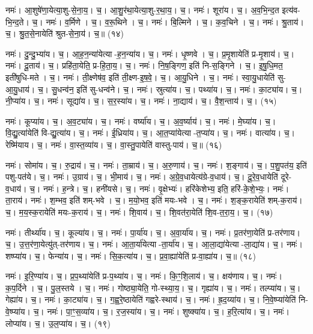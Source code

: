 नमः॑। आ॒शुषे॑णा॒येत्या॒शु-से॒ना॒य॒। च॒। आ॒शु॒र॑था॒येत्या॒शु-र॒था॒य॒। च॒। 
नमः॑। शूरा॑य। च॒। अ॒व॒भि॒न्द॒त इत्य॑व-भि॒न्द॒ते। च॒। 
नमः॑। व॒र्मिणे। च॒। व॒रू॒थिने। च॒। 
नमः॑। बि॒ल्मिने। च॒। क॒व॒चिने। च॒। 
नमः॑। श्रु॒ताय॑। च॒। श्रु॒त॒से॒नायेति॑ श्रुत-से॒ना॒य॑। च॒॥ (१४)


नमः॑। दु॒न्दु॒भ्या॑य। च॒। आ॒ह॒न॒न्या॑येत्या-ह॒न॒न्या॑य। च॒। 
नमः॑। धृ॒ष्णवे। च॒। प्र॒मृ॒शायेति॑ प्र-मृ॒शाय॑। च॒। 
नमः॑। दू॒ताय॑। च॒। प्रहि॑ता॒येति॒ प्र-हि॒ता॒य॒। च॒। 
नमः॑। नि॒ष॒ङ्गिण॒ इति॑ नि-स॒ङ्गिने। च॒। इ॒षु॒धि॒मत॒ इती॑षुधि-मते। च॒। 
नमः॑। ती॒क्ष्णेष॑व॒ इति॑ ती॒क्ष्ण-इ॒ष॒वे॒। च॒। आ॒यु॒धिने। च॒। 
नमः॑। स्वा॒यु॒धायेति॑ सु-आ॒यु॒धाय॑। च॒। सु॒धन्व॑न॒ इति॑ सु-धन्व॑ने। च॒। 
नमः॑। स्रुत्या॑य। च॒। पथ्या॑य। च॒। 
नमः॑। का॒ट्या॑य। च॒। नी॒प्या॑य। च॒। 
नमः॑। सूद्या॑य। च॒। स॒र॒स्या॑य। च॒। 
नमः॑। ना॒द्याय॑। च॒। वै॒श॒न्ताय॑। च॒। (१५)


नमः॑। कूप्या॑य। च॒। अ॒व॒ट्या॑य। च॒। 
नमः॑। वर्ष्या॑य। च॒। अ॒व॒र्ष्याय॑। च॒। 
नमः॑। मे॒घ्या॑य। च॒। वि॒द्यु॒त्या॑येति॑ वि-द्यु॒त्या॑य। च॒। 
नमः॑। ई॒ध्रिया॑य। च॒। आ॒त॒प्या॑येत्या-त॒प्या॑य। च॒। 
नमः॑। वात्या॑य। च॒। रेष्मि॑याय। च॒। 
नमः॑। वा॒स्त॒व्या॑य। च॒। वा॒स्तु॒पायेति॑ वास्तु-पाय॑। च॒॥ (१६)


नमः॑। सोमा॑य। च॒। रु॒द्राय॑। च॒। 
नमः॑। ता॒म्राय॑। च॒। अ॒रु॒णाय॑। च॒। 
नमः॑। श॒ङ्गाय॑। च॒। प॒शु॒पत॑य॒ इति॑ पशु-पत॑ये। च॒। 
नमः॑। उ॒ग्राय॑। च॒। भी॒माय॑। च॒। 
नमः॑। अ॒ग्रे॒व॒धायेत्य॑ग्रे-व॒धाय॑। च॒। दू॒रे॒व॒धायेति॑ दूरे-व॒धाय॑। च॒। 
नमः॑। ह॒न्त्रे। च॒। हनी॑यसे। च॒। 
नमः॑। वृ॒क्षेभ्यः॑। हरि॑केशेभ्य॒ इति॒ हरि॑-के॒शे॒भ्यः॒। 
नमः॑। ता॒राय॑। नमः॑। श॒म्भव॒ इति॑ शम्-भवे। च॒। म॒यो॒भव॒ इति॑ मयः-भवे। च॒। 
नमः॑। श॒ङ्क॒रायेति॑ शम्-क॒राय॑। च॒। म॒य॒स्क॒रायेति॑ मयः-क॒राय॑। च॒। 
नमः॑। शि॒वाय॑। च॒। शि॒वत॑रा॒येति॑ शि॒व-त॒रा॒य॒। च॒। (१७)


नमः॑। तीर्थ्या॑य। च॒। कूल्या॑य। च॒। 
नमः॑। पा॒र्या॑य। च॒। अ॒वा॒र्या॑य। च॒। 
नमः॑। प्र॒तर॑णा॒येति॑ प्र-तर॑णाय। च॒। उ॒त्त॒र॑णा॒येत्यु॑त्-तर॑णाय। च॒। 
नमः॑। आ॒ता॒र्या॑येत्या-ता॒र्या॑य। च॒। आ॒ला॒द्या॑येत्या-ला॒द्या॑य। च॒। 
नमः॑। शष्प्या॑य। च॒। फेन्या॑य। च॒। 
नमः॑। सि॒क॒त्या॑य। च॒। प्र॒वा॒ह्या॑येति॑ प्र-वा॒ह्या॑य। च॒॥ (१८)


नमः॑। इ॒रि॒ण्या॑य। च॒। प्र॒प॒थ्या॑येति॑ प्र-प॒थ्या॑य। च॒। 
नमः॑। कि॒ꣳ॒शि॒लाय॑। च॒। क्षय॑णाय। च॒। 
नमः॑। क॒प॒र्दिने। च॒। पु॒ल॒स्तये। च॒। 
नमः॑। गोष्ठ्या॒येति॒ गो-स्थ्या॒य॒। च॒। गृह्या॑य। च॒। 
नमः॑। तल्प्या॑य। च॒। गेह्या॑य। च॒। 
नमः॑। का॒ट्या॑य। च॒। ग॒ह्व॒रे॒ष्ठायेति॑ गह्वरे-स्थाय॑। च॒। 
नमः॑। ह्र॒द॒य्या॑य। च॒। नि॒वे॒ष्प्या॑येति॑ नि-वे॒ष्प्या॑य। च॒। 
नमः॑। पा॒ꣳ॒स॒व्या॑य। च॒। र॒ज॒स्या॑य। च॒। 
नमः॑। शुष्क्या॑य। च॒। ह॒रि॒त्या॑य। च॒। 
नमः॑। लोप्या॑य। च॒। उ॒ल॒प्या॑य। च॒। (१९)


